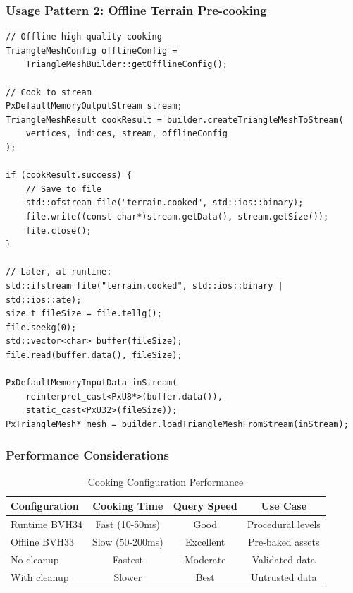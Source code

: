 \subsubsection{Usage Pattern 2: Offline Terrain Pre-cooking}

\begin{lstlisting}[caption={Offline cooking with file export}]
// Offline high-quality cooking
TriangleMeshConfig offlineConfig =
    TriangleMeshBuilder::getOfflineConfig();

// Cook to stream
PxDefaultMemoryOutputStream stream;
TriangleMeshResult cookResult = builder.createTriangleMeshToStream(
    vertices, indices, stream, offlineConfig
);

if (cookResult.success) {
    // Save to file
    std::ofstream file("terrain.cooked", std::ios::binary);
    file.write((const char*)stream.getData(), stream.getSize());
    file.close();
}

// Later, at runtime:
std::ifstream file("terrain.cooked", std::ios::binary | std::ios::ate);
size_t fileSize = file.tellg();
file.seekg(0);
std::vector<char> buffer(fileSize);
file.read(buffer.data(), fileSize);

PxDefaultMemoryInputData inStream(
    reinterpret_cast<PxU8*>(buffer.data()),
    static_cast<PxU32>(fileSize));
PxTriangleMesh* mesh = builder.loadTriangleMeshFromStream(inStream);
\end{lstlisting}

\subsubsection{Performance Considerations}

\begin{table}[h]
\centering
\begin{tabular}{|l|c|c|c|}
\hline
\textbf{Configuration} & \textbf{Cooking Time} & \textbf{Query Speed} & \textbf{Use Case} \\
\hline
Runtime BVH34 & Fast (10-50ms) & Good & Procedural levels \\
\hline
Offline BVH33 & Slow (50-200ms) & Excellent & Pre-baked assets \\
\hline
No cleanup & Fastest & Moderate & Validated data \\
\hline
With cleanup & Slower & Best & Untrusted data \\
\hline
\end{tabular}
\caption{Cooking Configuration Performance}
\end{table}

